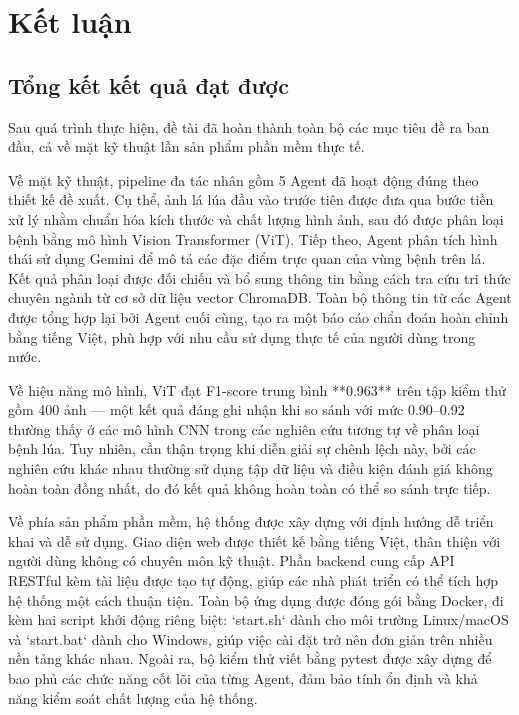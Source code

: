 \chapter{Kết luận}

\section{Tổng kết kết quả đạt được}

Sau quá trình thực hiện, đề tài đã hoàn thành toàn bộ các mục tiêu đề ra ban đầu, cả về mặt kỹ thuật lẫn sản phẩm phần mềm thực tế.

Về mặt kỹ thuật, pipeline đa tác nhân gồm 5 Agent đã hoạt động đúng theo thiết kế đề xuất. Cụ thể, ảnh lá lúa đầu vào trước tiên được đưa qua bước tiền xử lý nhằm chuẩn hóa kích thước và chất lượng hình ảnh, sau đó được phân loại bệnh bằng mô hình Vision Transformer (ViT). Tiếp theo, Agent phân tích hình thái sử dụng Gemini để mô tả các đặc điểm trực quan của vùng bệnh trên lá. Kết quả phân loại được đối chiếu và bổ sung thông tin bằng cách tra cứu tri thức chuyên ngành từ cơ sở dữ liệu vector ChromaDB. Toàn bộ thông tin từ các Agent được tổng hợp lại bởi Agent cuối cùng, tạo ra một báo cáo chẩn đoán hoàn chỉnh bằng tiếng Việt, phù hợp với nhu cầu sử dụng thực tế của người dùng trong nước.

Về hiệu năng mô hình, ViT đạt F1-score trung bình **0.963** trên tập kiểm thử gồm 400 ảnh — một kết quả đáng ghi nhận khi so sánh với mức 0.90–0.92 thường thấy ở các mô hình CNN trong các nghiên cứu tương tự về phân loại bệnh lúa. Tuy nhiên, cần thận trọng khi diễn giải sự chênh lệch này, bởi các nghiên cứu khác nhau thường sử dụng tập dữ liệu và điều kiện đánh giá không hoàn toàn đồng nhất, do đó kết quả không hoàn toàn có thể so sánh trực tiếp.

Về phía sản phẩm phần mềm, hệ thống được xây dựng với định hướng dễ triển khai và dễ sử dụng. Giao diện web được thiết kế bằng tiếng Việt, thân thiện với người dùng không có chuyên môn kỹ thuật. Phần backend cung cấp API RESTful kèm tài liệu được tạo tự động, giúp các nhà phát triển có thể tích hợp hệ thống một cách thuận tiện. Toàn bộ ứng dụng được đóng gói bằng Docker, đi kèm hai script khởi động riêng biệt: `start.sh` dành cho môi trường Linux/macOS và `start.bat` dành cho Windows, giúp việc cài đặt trở nên đơn giản trên nhiều nền tảng khác nhau. Ngoài ra, bộ kiểm thử viết bằng pytest được xây dựng để bao phủ các chức năng cốt lõi của từng Agent, đảm bảo tính ổn định và khả năng kiểm soát chất lượng của hệ thống.

